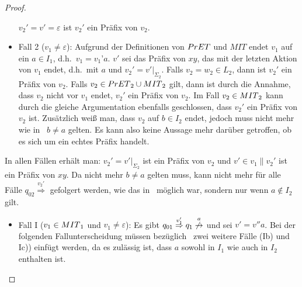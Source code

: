 \begin{proof}
\begin{itemize}
      $v_2'=v'=\varepsilon$ ist $v_2'$ ein Präfix von $v_2$.
    \item Fall 2 ($v_1\neq\varepsilon$): Aufgrund der Definitionen von $PrET{}$
      und $MIT$ endet $v_1$ auf ein $a\in I_1$, d.h.\ $v_1=v_1’a$. $v'$ sei das
      Präfix von $xy$, das mit der letzten Aktion von $v_1$ endet, d.h.\ mit
      $a$ und $v_2'=v'|_{\Sigma _{2}}$. Falls $v_2 = w_2\in L_2$, dann ist
      $v_2'$ ein Präfix von $v_2$. Falls $v_2\in
      PrET{}_2\cup MIT{}_2$ gilt, dann ist durch die Annahme, dass $v_2$ nicht vor
      $v_1$ endet, $v_2'$ ein Präfix von $v_2$. Im Fall $v_2\in MIT{}_2$ kann
      durch die gleiche Argumentation ebenfalls geschlossen, dass $v_2'$ ein
      Präfix von $v_2$ ist. Zusätzlich weiß man, dass $v_2$ auf $b\in
      I_2$ endet, jedoch muss nicht mehr wie in~\cite{Vogler2014EIO} $b\neq a$
      gelten. Es kann also keine Aussage mehr darüber getroffen, ob es sich um
      ein echtes Präfix handelt.
  \end{itemize}
  In allen Fällen erhält man: $v_2'=v'|_{\Sigma _2}$ ist ein Präfix von $v_2$
  und $v'\in v_1\| v_2'$ ist ein Präfix von $xy$. Da nicht mehr $b\neq a$
  gelten muss, kann nicht mehr für alle Fälle $q_{02}
  \overset{v_2'}{\Rightarrow}$ gefolgert werden, wie das
  in~\cite{Vogler2014EIO} möglich war, sondern nur wenn $a\notin I_2$ gilt.
  \begin{itemize}
    \item Fall I ($v_1\in MIT{}_1$ und $v_1\neq\varepsilon$): Es gibt $q_{01}
      \overset{v_1'}{\Rightarrow}q_1
      \overset{a}{\not{\hspace{-0.1cm}\rightarrow}}$ und sei $v'=v''a$. Bei der
      folgenden Fallunterscheidung müssen bezüglich~\cite{Vogler2014EIO}
      zwei weitere Fälle (Ib) und Ic)) einfügt werden, da es zulässig ist, dass $a$
      sowohl in $I_1$ wie auch in $I_2$ enthalten ist.
\end{itemize}
\end{proof}
